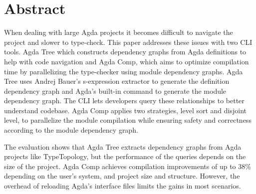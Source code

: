 
\chapter*{Abstract}

When dealing with large Agda projects it becomes difficult to navigate the
project and slower to type-check. This paper addresses these issues with two
CLI tools. Agda Tree which constructs dependency graphs from Agda definitions
to help with code navigation and Agda Comp, which aims to optimize compilation
time by parallelizing the type-checker using module dependency graphs. Agda
Tree uses Andrej Bauer's s-expression extractor to generate the definition
dependency graph and Agda's built-in command to generate the module dependency
graph. The CLI lets developers query these relationships to better understand
codebase. Agda Comp applies two strategies, level sort and disjoint level, to
parallelize the module compilation while ensuring safety and correctness
according to the module dependency graph.

The evaluation shows that Agda Tree extracts dependency graphs from Agda
projects like TypeTopology, but the performance of the queries depends on the
size of the project. Agda Comp achieves compilation improvements of up to 38\%
depending on the user's system, and project size and structure. However, the
overhead of reloading Agda's interface files limits the gains in most
scenarios.


%
%
